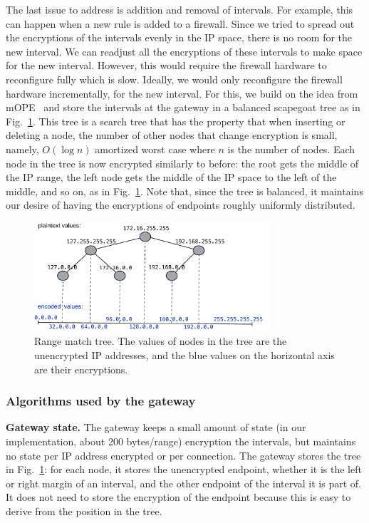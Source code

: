 The last issue to address is addition and removal of intervals. For example, this can happen when a new rule is added to a firewall. 
Since we tried to spread out the encryptions of the intervals evenly in the IP space, there is no room for the new interval. We can 
readjust all the encryptions of these intervals to make space for the new interval. However, this would require the firewall hardware to reconfigure fully which is slow. Ideally, we would only reconfigure the firewall hardware incrementally, for the new interval. For this, we build on the idea from mOPE~\cite{popa:mope} and store the intervals at the gateway in a balanced scapegoat tree as in Fig.~\ref{fig:tree}. This tree is a search tree that has the property that when inserting or deleting a node, the number of other nodes that change encryption is small, namely, $O(\log n)$ amortized worst case where $n$ is the number of nodes. Each node in the tree is now encrypted similarly to before: the root gets the middle of the IP range,  the left node gets the middle of the IP space to the left of the middle, and so on, as in Fig.~\ref{fig:tree}.  Note that, since the tree is balanced, it maintains our desire of having the encryptions of endpoints roughly uniformly distributed.

\begin{figure}
  \includegraphics[width=3.45in]{fig/tree}
  \caption{\label{fig:tree} Range match tree. The values of nodes in the tree are the unencrypted IP addresses, and the blue values on the horizontal axis are their encryptions. }
\end{figure}




\subsubsection{Algorithms used by the gateway}\label{s:rangealg}

\noindent\textbf{Gateway state.} The gateway keeps a small amount of state (in our implementation, about 200 bytes/range) encryption the intervals, but maintains no state per IP address encrypted or per connection. The gateway stores the tree in Fig.~\ref{fig:tree}: for each node, it stores the unencrypted endpoint, whether it is the left or  right margin of an interval, and the other endpoint of the interval it is part of. It does not need to store the encryption of the endpoint because this is easy to derive from the position in the tree. 


